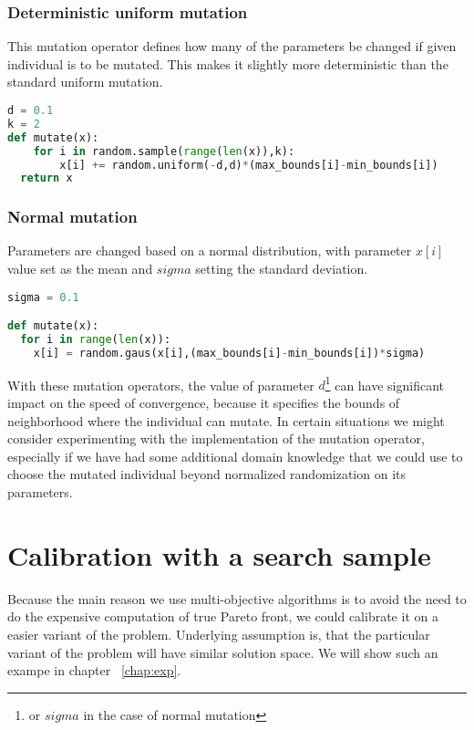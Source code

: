\documentclass[12pt,oneside]{fithesis2}
\begin{document}
\subsubsection{Deterministic uniform mutation}
This mutation operator defines how many of the parameters be changed if given individual is to be mutated. This makes it  slightly more deterministic than the standard uniform mutation.
\begin{lstlisting}[language=Python,label=mutate_example,caption=Deterministic uniform mutation example]
d = 0.1
k = 2
def mutate(x):
    for i in random.sample(range(len(x)),k):
        x[i] += random.uniform(-d,d)*(max_bounds[i]-min_bounds[i])
  return x
\end{lstlisting}

\subsubsection{Normal mutation}
Parameters are changed based on a normal distribution, with parameter $x[i]$ value set as the mean and $sigma$ setting the standard deviation.
\begin{lstlisting}[language=Python,label=mutate_example,caption=Normal mutation example]
sigma = 0.1

def mutate(x):
  for i in range(len(x)):
    x[i] = random.gaus(x[i],(max_bounds[i]-min_bounds[i])*sigma)
\end{lstlisting}

With these mutation operators, the value of parameter $d$\footnote{or $sigma$ in the case of normal mutation} can have significant impact on the speed of convergence, because it specifies the bounds of neighborhood where the individual can mutate. In certain situations we might consider experimenting with the implementation of the mutation operator, especially if we have had some additional domain knowledge that we could use to choose the mutated individual beyond normalized randomization on its parameters.

\section{Calibration with a search sample}
Because the main reason we use multi-objective algorithms is to avoid the need to do the expensive computation of true Pareto front, we could calibrate it on a easier variant of the problem. Underlying assumption is, that the particular variant of the problem will have similar solution space. We will show such an exampe in chapter ~\ref{chap:exp}.
\end{document}
